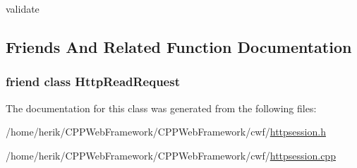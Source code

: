 validate 



\subsection{Friends And Related Function Documentation}
\hypertarget{class_c_w_f_1_1_http_session_a4d54f5003e07e218070a449c22a52c7c}{
\subsubsection[{Http\+Read\+Request}]{\setlength{\rightskip}{0pt plus 5cm}friend class {\bf Http\+Read\+Request}\hspace{0.3cm}{\ttfamily [friend]}}}\label{class_c_w_f_1_1_http_session_a4d54f5003e07e218070a449c22a52c7c}


The documentation for this class was generated from the following files\+:\begin{DoxyCompactItemize}
\item 
/home/herik/\+C\+P\+P\+Web\+Framework/\+C\+P\+P\+Web\+Framework/cwf/\hyperlink{httpsession_8h}{httpsession.\+h}\item 
/home/herik/\+C\+P\+P\+Web\+Framework/\+C\+P\+P\+Web\+Framework/cwf/\hyperlink{httpsession_8cpp}{httpsession.\+cpp}\end{DoxyCompactItemize}

